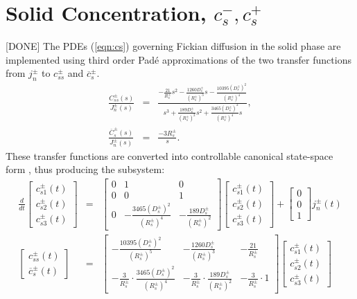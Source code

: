 \documentclass[12pt]{article}
\begin{document}
\section{Solid Concentration, $c_{s}^{-}, c_{s}^{+}$}\label{sec:cs}
[DONE] The PDEs (\ref{eqn:cs}) governing Fickian diffusion in the solid phase are implemented using third order Pad\'{e} approximations of the two transfer functions from $j_{n}^{\pm}$ to $c_{ss}^{\pm}$ and $\overline{c}_{s}^{\pm}$. 
\begin{eqnarray}
	\frac{C_{ss}^{\pm}(s)}{J_{n}^{\pm}(s)} &=& \frac{-\frac{21}{R_{s}^{\pm}}s^{2} -\frac{1260 D_{s}^{\pm}}{(R_{s}^{\pm})^{3}}s -\frac{10395 (D_{s}^{\pm})^{2}}{ (R_{s}^{\pm})^{4} }  }{s^{3} + \frac{189 D_{s}^{\pm}}{(R_{s}^{\pm})^{2}} s^{2} + \frac{3465 (D_{s}^{\pm})^{2}}{(R_{s}^{\pm})^{4}} s }, \\
	\frac{\overline{C}_{s}^{\pm}(s)}{J_{n}^{\pm}(s)} &=& \frac{-3 R_{s}^{\pm}}{s}.
\end{eqnarray}
These transfer functions are converted into controllable canonical state-space form , thus producing the subsystem:
\begin{eqnarray}
\frac{d}{dt}
\left[
\begin{array}{c}
 c_{s1}^{\pm}(t) \\
 c_{s2}^{\pm}(t) \\
 c_{s3}^{\pm}(t)
\end{array}
\right]
&=&
\left[
\begin{array}{ccc}
 0 & 1  & 0  \\
 0 & 0  & 1  \\
 0 & -\frac{3465 (D_{s}^{\pm})^{2}}{(R_{s}^{\pm})^{4}}  & -\frac{189 D_{s}^{\pm}}{(R_{s}^{\pm})^{2}}  
\end{array}
\right]
\left[
\begin{array}{c}
 c_{s1}^{\pm}(t) \\
 c_{s2}^{\pm}(t) \\
 c_{s3}^{\pm}(t)
\end{array}
\right] + 
\left[
\begin{array}{c}
 0 \\
 0 \\
 1
\end{array}
\right] j_{n}^{\pm}(t) \\
\left[
\begin{array}{c}
 c_{ss}^{\pm}(t) \\
 \overline{c}_{s}^{\pm}(t)
\end{array}
\right] &=& 
\left[
\begin{array}{ccc}
 -\frac{10395 (D_{s}^{\pm})^{2}}{(R_{s}^{\pm})^{5}} & -\frac{1260 D_{s}^{\pm}}{(R_{s}^{\pm})^{3}}  & -\frac{21}{R_{s}^{\pm}}  \\
 -\frac{3}{R_{s}^{\pm}} \cdot \frac{3465 (D_{s}^{\pm})^{2}}{(R_{s}^{\pm})^{4}} & -\frac{3}{R_{s}^{\pm}} \cdot \frac{189 D_{s}^{\pm}}{(R_{s}^{\pm})^{2}} & -\frac{3}{R_{s}^{\pm}} \cdot 1
\end{array}
\right]
\left[
\begin{array}{c}
 c_{s1}^{\pm}(t) \\
 c_{s2}^{\pm}(t) \\
 c_{s3}^{\pm}(t)
\end{array}
\right]
\end{eqnarray}
\end{document}
